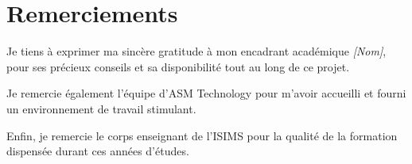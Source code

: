 \chapter*{Remerciements}

Je tiens à exprimer ma sincère gratitude à mon encadrant académique \textit{[Nom]}, pour ses précieux conseils et sa disponibilité tout au long de ce projet.

Je remercie également l'équipe d'ASM Technology pour m'avoir accueilli et fourni un environnement de travail stimulant.

Enfin, je remercie le corps enseignant de l'ISIMS pour la qualité de la formation dispensée durant ces années d'études.
